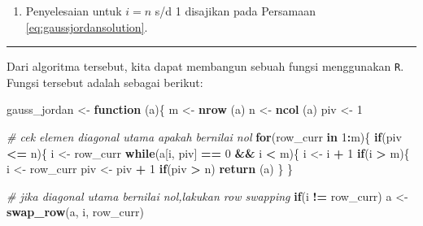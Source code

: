 \documentclass[
]{book}
\newenvironment{Shaded}{\begin{snugshade}}{\end{snugshade}}
\newcommand{\CommentTok}[1]{\textcolor[rgb]{0.56,0.35,0.01}{\textit{#1}}}
\newcommand{\ControlFlowTok}[1]{\textcolor[rgb]{0.13,0.29,0.53}{\textbf{#1}}}
\newcommand{\DecValTok}[1]{\textcolor[rgb]{0.00,0.00,0.81}{#1}}
\newcommand{\FunctionTok}[1]{\textcolor[rgb]{0.13,0.29,0.53}{\textbf{#1}}}
\newcommand{\NormalTok}[1]{#1}
\newcommand{\OtherTok}[1]{\textcolor[rgb]{0.56,0.35,0.01}{#1}}
\newcommand{\SpecialCharTok}[1]{\textcolor[rgb]{0.81,0.36,0.00}{\textbf{#1}}}
\providecommand{\tightlist}{%
  \setlength{\itemsep}{0pt}\setlength{\parskip}{0pt}}
\theoremstyle{definition}
\theoremstyle{definition}
\theoremstyle{definition}
\theoremstyle{definition}
\theoremstyle{remark}
\begin{document}
\begin{enumerate}
\def\labelenumi{\arabic{enumi}.}
\setcounter{enumi}{4}
\tightlist
\item
  Penyelesaian untuk \(i=n\) s/d 1 disajikan pada Persamaan \eqref{eq:gaussjordansolution}.
\end{enumerate}

\begin{center}\rule{0.5\linewidth}{0.5pt}\end{center}

Dari algoritma tersebut, kita dapat membangun sebuah fungsi menggunakan \texttt{R}. Fungsi tersebut adalah sebagai berikut:

\begin{Shaded}
\begin{Highlighting}[]
\NormalTok{gauss\_jordan }\OtherTok{\textless{}{-}} \ControlFlowTok{function}\NormalTok{ (a)\{}
\NormalTok{    m }\OtherTok{\textless{}{-}} \FunctionTok{nrow}\NormalTok{ (a)}
\NormalTok{    n }\OtherTok{\textless{}{-}} \FunctionTok{ncol}\NormalTok{ (a)}
\NormalTok{    piv }\OtherTok{\textless{}{-}} \DecValTok{1}
    
\CommentTok{\# cek elemen diagonal utama apakah bernilai nol}
    \ControlFlowTok{for}\NormalTok{(row\_curr }\ControlFlowTok{in} \DecValTok{1}\SpecialCharTok{:}\NormalTok{m)\{}
        \ControlFlowTok{if}\NormalTok{(piv }\SpecialCharTok{\textless{}=}\NormalTok{ n)\{}
\NormalTok{            i }\OtherTok{\textless{}{-}}\NormalTok{ row\_curr}
            \ControlFlowTok{while}\NormalTok{(a[i, piv] }\SpecialCharTok{==} \DecValTok{0} \SpecialCharTok{\&\&}\NormalTok{ i }\SpecialCharTok{\textless{}}\NormalTok{ m)\{}
\NormalTok{                i }\OtherTok{\textless{}{-}}\NormalTok{ i }\SpecialCharTok{+} \DecValTok{1}
                \ControlFlowTok{if}\NormalTok{(i }\SpecialCharTok{\textgreater{}}\NormalTok{ m)\{}
\NormalTok{                    i }\OtherTok{\textless{}{-}}\NormalTok{ row\_curr}
\NormalTok{                    piv }\OtherTok{\textless{}{-}}\NormalTok{ piv }\SpecialCharTok{+} \DecValTok{1}
                    \ControlFlowTok{if}\NormalTok{(piv }\SpecialCharTok{\textgreater{}}\NormalTok{ n)}
                        \FunctionTok{return}\NormalTok{ (a)}
\NormalTok{                \}}
\NormalTok{            \}}

\CommentTok{\# jika diagonal utama bernilai nol,lakukan row swapping}
            \ControlFlowTok{if}\NormalTok{(i }\SpecialCharTok{!=}\NormalTok{ row\_curr)}
\NormalTok{                a }\OtherTok{\textless{}{-}} \FunctionTok{swap\_row}\NormalTok{(a, i, row\_curr)}
            

\end{Highlighting}
\end{Shaded}
\end{document}
